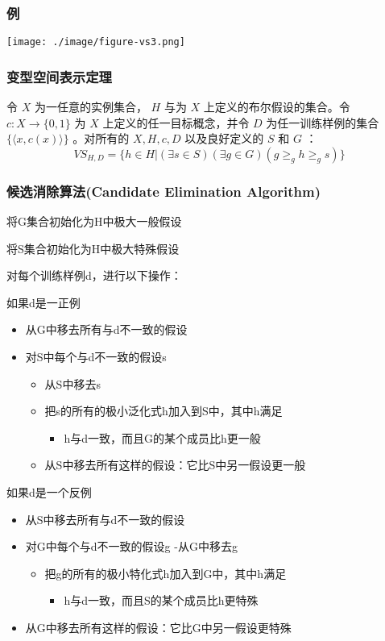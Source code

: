 \documentclass{beamer}
\begin{document}
\begin{frame}
\frametitle{例}
\label{sec-3-4}

\center
\texttt{[image: ./image/figure-vs3.png]}
\end{frame}
\begin{frame}
\frametitle{变型空间表示定理}
\label{sec-3-5}


令 $X$ 为一任意的实例集合， $H$ 与为 $X$ 上定义的布尔假设的集合。令 $c: X\rightarrow\{0, 1\}$ 为 $X$ 上定义的任一目标概念，并令 $D$ 为任一训练样例的集合 $\{\langle x, c(x)\rangle\}$ 。对所有的 $X,H,c,D$ 以及良好定义的 $S$ 和 $G$ ：
 $$VS_{H,D} = \{ h\in H | (\exists s\in S) (\exists g\in G) (g\geq_g h \geq_g s)\}$$
\end{frame}
\begin{frame}
\frametitle{候选消除算法(Candidate Elimination Algorithm)}
\label{sec-3-6}

将G集合初始化为H中极大一般假设

将S集合初始化为H中极大特殊假设

对每个训练样例d，进行以下操作：

如果d是一正例
\begin{itemize}
\item 从G中移去所有与d不一致的假设
\item 对S中每个与d不一致的假设s
\begin{itemize}
\item 从S中移去s
\item 把s的所有的极小泛化式h加入到S中，其中h满足
\begin{itemize}
\item h与d一致，而且G的某个成员比h更一般
\end{itemize}
\item 从S中移去所有这样的假设：它比S中另一假设更一般
\end{itemize}
\end{itemize}

如果d是一个反例
\begin{itemize}
\item 从S中移去所有与d不一致的假设
\item 对G中每个与d不一致的假设g
               -从G中移去g
\begin{itemize}
\item 把g的所有的极小特化式h加入到G中，其中h满足
\begin{itemize}
\item h与d一致，而且S的某个成员比h更特殊
\end{itemize}
\end{itemize}
\item 从G中移去所有这样的假设：它比G中另一假设更特殊
\end{itemize}
\end{frame}
\end{document}

